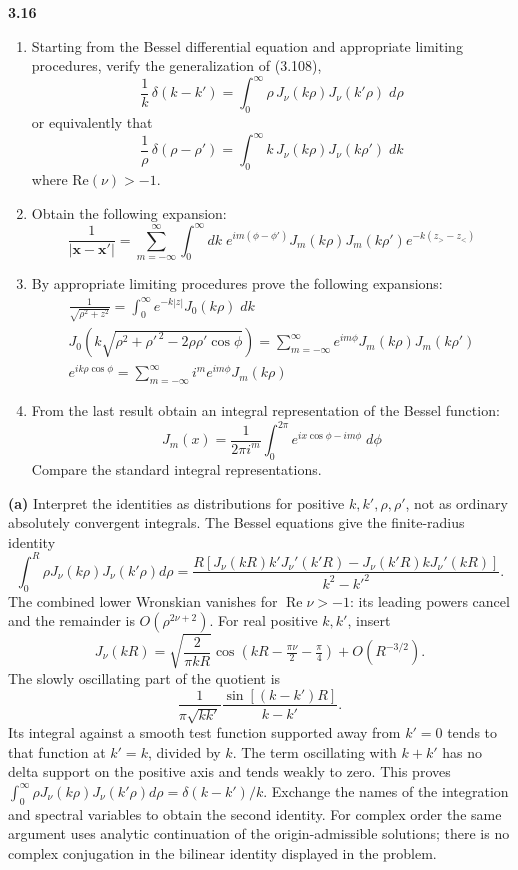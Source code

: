 \par\bigskip
\noindent\textbf{3.16}\quad\begin{enumerate}
\item[(a)] Starting from the Bessel differential equation and appropriate limiting procedures, verify the generalization of (3.108),
\[
\frac{1}{k}\,\delta(k-k')=\int_{0}^{\infty}\rho\,J_{\nu}(k\rho)J_{\nu}(k'\rho)\;d\rho
\]
or equivalently that
\[
\frac{1}{\rho}\,\delta(\rho-\rho')=\int_{0}^{\infty}k\,J_{\nu}(k\rho)J_{\nu}(k\rho')\;dk
\]
where $\mathrm{Re}(\nu)>-1$.
\item[(b)] Obtain the following expansion:
\[
\frac{1}{|\mathbf{x}-\mathbf{x}'|}=\sum_{m=-\infty}^{\infty}\int_{0}^{\infty}dk\;e^{im(\phi-\phi')}J_{m}(k\rho)J_{m}(k\rho')e^{-k(z_{>}-z_{<})}
\]
\item[(c)] By appropriate limiting procedures prove the following expansions:
\begin{gather*}
\frac{1}{\sqrt{\rho^{2}+z^{2}}}=\int_{0}^{\infty}e^{-k|z|}J_{0}(k\rho)\;dk\\
J_{0}\!\left(k\sqrt{\rho^{2}+\rho'^{\,2}-2\rho\rho'\cos\phi}\right)=\sum_{m=-\infty}^{\infty}e^{im\phi}J_{m}(k\rho)J_{m}(k\rho')\\
e^{ik\rho\cos\phi}=\sum_{m=-\infty}^{\infty}i^{m}e^{im\phi}J_{m}(k\rho)
\end{gather*}
\item[(d)] From the last result obtain an integral representation of the Bessel function:
\[
J_{m}(x)=\frac{1}{2\pi i^{m}}\int_{0}^{2\pi}e^{ix\cos\phi-im\phi}\;d\phi
\]
Compare the standard integral representations.
\end{enumerate}
\solution

\textbf{(a)} Interpret the identities as distributions for positive
$k,k',\rho,\rho'$, not as ordinary absolutely convergent integrals.
The Bessel equations give the finite-radius identity
\[
\int_0^R\rho J_\nu(k\rho)J_\nu(k'\rho)d\rho
=\frac{R[J_\nu(kR)k'J_\nu'(k'R)
-J_\nu(k'R)kJ_\nu'(kR)]}{k^2-k'^2}.
\]
The combined lower Wronskian vanishes for $\operatorname{Re}\nu>-1$:
its leading powers cancel and the remainder is $O(\rho^{2\nu+2})$.
For real positive $k,k'$, insert
\[
J_\nu(kR)=\sqrt{\frac2{\pi kR}}
\cos(kR-\tfrac{\pi\nu}2-\tfrac\pi4)+O(R^{-3/2}).
\]
The slowly oscillating part of the quotient is
\[
\frac{1}{\pi\sqrt{kk'}}\frac{\sin[(k-k')R]}{k-k'}.
\]
Its integral against a smooth test function supported away from
$k'=0$ tends to that function at $k'=k$, divided by $k$.
The term oscillating with $k+k'$ has no delta support on the positive
axis and tends weakly to zero.  This proves
$\int_0^\infty\rho J_\nu(k\rho)J_\nu(k'\rho)d\rho
=\delta(k-k')/k$.  Exchange the names of the integration and
spectral variables to obtain the second identity.
For complex order the same argument uses analytic continuation of
the origin-admissible solutions; there is no complex conjugation in
the bilinear identity displayed in the problem.

